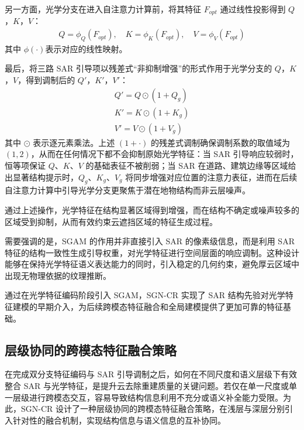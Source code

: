 另一方面，光学分支在进入自注意力计算前，将其特征 $F_{opt}$ 通过线性投影得到 $Q$，$K$，$V$：
\begin{equation}
\begin{aligned}
Q = \phi_Q(F_{opt}),\quad
K = \phi_K(F_{opt}),\quad
V = \phi_V(F_{opt})
\end{aligned}
\end{equation}
其中 $\phi(\cdot)$表示对应的线性映射。

最后，将三路 SAR 引导项以残差式“非抑制增强”的形式作用于光学分支的 $Q$，$K$，$V$，得到调制后的 $Q'$，$K'$，$V'$：
\begin{equation}
\begin{aligned}
Q' = Q \odot (1 + Q_g)\\
K' = K \odot (1 + K_g)\\
V' = V \odot (1 + V_g)
\end{aligned}
\end{equation}
其中 $\odot$ 表示逐元素乘法。上述 $(1+\cdot)$ 的残差式调制确保调制系数的取值域为 $(1,2)$，从而在任何情况下都不会抑制原始光学特征：当 SAR 引导响应较弱时，恒等项保证 $Q$、$K$、$V$ 的基础表征不被削弱；当 SAR 在道路、建筑边缘等区域给出显著结构提示时，$Q_g$、$K_g$、$V_g$ 将同步增强对应位置的注意力表征，进而在后续自注意力计算中引导光学分支更聚焦于潜在地物结构而非云层噪声。

通过上述操作，光学特征在结构显著区域得到增强，而在结构不确定或噪声较多的区域受到抑制，从而有效约束云遮挡区域的特征生成过程。

需要强调的是，SGAM 的作用并非直接引入 SAR 的像素级信息，而是利用 SAR 特征的结构一致性生成引导权重，对光学特征进行空间层面的响应调制。这种设计能够在保持光学特征语义表达能力的同时，引入稳定的几何约束，避免厚云区域中出现无物理依据的纹理推断。

通过在光学特征编码阶段引入 SGAM，SGN-CR 实现了 SAR 结构先验对光学特征建模的早期介入，为后续跨模态特征融合和全局建模提供了更加可靠的特征基础。

\subsection{层级协同的跨模态特征融合策略}

在完成双分支特征编码与 SAR 引导调制之后，如何在不同尺度和语义层级下有效整合 SAR 与光学特征，是提升云去除重建质量的关键问题。若仅在单一尺度或单一层级进行跨模态交互，容易导致结构信息利用不充分或语义补全能力受限。为此，SGN-CR 设计了一种层级协同的跨模态特征融合策略，在浅层与深层分别引入针对性的融合机制，实现结构信息与语义信息的互补协同。

